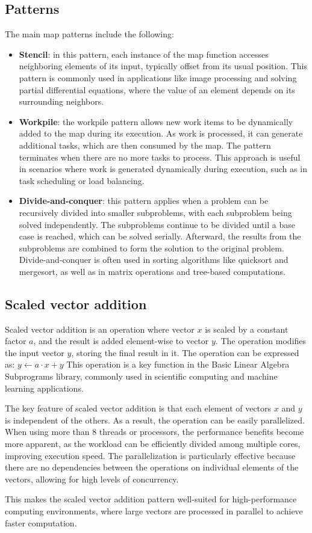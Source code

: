\subsection{Patterns}
The main map patterns include the following:
\begin{itemize}
    \item \textbf{Stencil}: in this pattern, each instance of the map function accesses neighboring elements of its input, typically offset from its usual position. 
        This pattern is commonly used in applications like image processing and solving partial differential equations, where the value of an element depends on its surrounding neighbors.
    \item \textbf{Workpile}: the workpile pattern allows new work items to be dynamically added to the map during its execution. 
        As work is processed, it can generate additional tasks, which are then consumed by the map. 
        The pattern terminates when there are no more tasks to process. 
        This approach is useful in scenarios where work is generated dynamically during execution, such as in task scheduling or load balancing.
    \item \textbf{Divide-and-conquer}: this pattern applies when a problem can be recursively divided into smaller subproblems, with each subproblem being solved independently. 
        The subproblems continue to be divided until a base case is reached, which can be solved serially. 
        Afterward, the results from the subproblems are combined to form the solution to the original problem. 
        Divide-and-conquer is often used in sorting algorithms like quicksort and mergesort, as well as in matrix operations and tree-based computations.    
\end{itemize}

\subsection{Scaled vector addition}
Scaled vector addition is an operation where vector $x$ is scaled by a constant factor $a$, and the result is added element-wise to vector $y$. 
The operation modifies the input vector $y$, storing the final result in it.
The operation can be expressed as:
$y\leftarrow a\cdot x+y$
This operation is a key function in the Basic Linear Algebra Subprograms library, commonly used in scientific computing and machine learning applications.

The key feature of scaled vector addition is that each element of vectors $x$ and $y$ is independent of the others. 
As a result, the operation can be easily parallelized. 
When using more than 8 threads or processors, the performance benefits become more apparent, as the workload can be efficiently divided among multiple cores, improving execution speed.
The parallelization is particularly effective because there are no dependencies between the operations on individual elements of the vectors, allowing for high levels of concurrency.

This makes the scaled vector addition pattern well-suited for high-performance computing environments, where large vectors are processed in parallel to achieve faster computation.